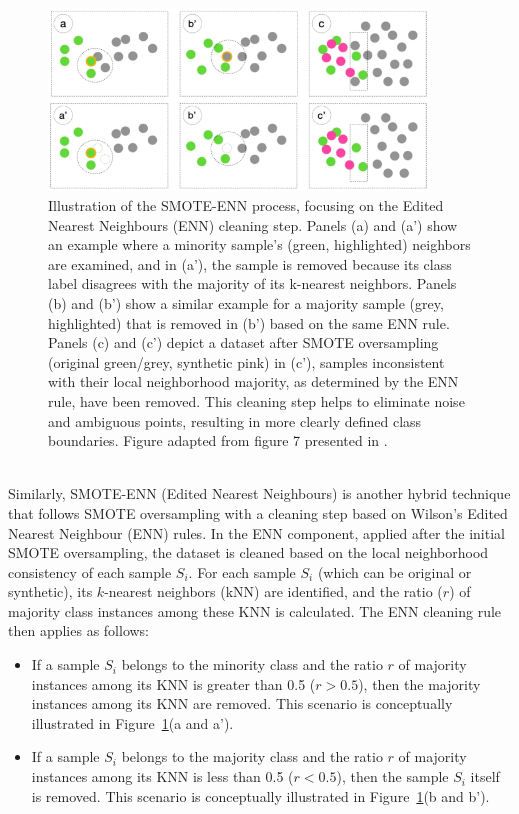 \documentclass[12pt,a4paper]{report}
\begin{document}
\begin{figure}[h!]
  \centering
  \includegraphics[width=0.9\textwidth]{images/SMOTE-EEN.png}
  \caption[Illustration of SMOTE-ENN Process]{Illustration of the SMOTE-ENN process, focusing on the Edited Nearest Neighbours (ENN) cleaning step. Panels (a) and (a') show an example where a minority sample's (green, highlighted) neighbors are examined, and in (a'), the sample is removed because its class label disagrees with the majority of its k-nearest neighbors. Panels (b) and (b') show a similar example for a majority sample (grey, highlighted) that is removed in (b') based on the same ENN rule. Panels (c) and (c') depict a dataset after SMOTE oversampling (original green/grey, synthetic pink) in (c'), samples inconsistent with their local neighborhood majority, as determined by the ENN rule, have been removed. This cleaning step helps to eliminate noise and ambiguous points, resulting in more clearly defined class boundaries. Figure adapted from figure 7 presented in \cite{Truong2022SMOTEVariants}.}
  \label{fig:SMOTE-ENN} %
\end{figure}
\\
\noindent
Similarly, SMOTE-ENN (Edited Nearest Neighbours) \cite{Batista2004Study} is another hybrid technique that follows SMOTE oversampling with a cleaning step based on Wilson’s Edited Nearest Neighbour (ENN) rules. In the ENN component, applied after the initial SMOTE oversampling, the dataset is cleaned based on the local neighborhood consistency of each sample $S_i$. For each sample $S_i$ (which can be original or synthetic), its $k$-nearest neighbors (kNN) are identified, and the ratio ($r$) of majority class instances among these KNN is calculated. The ENN cleaning rule then applies as follows:
\begin{itemize}
    \item If a sample $S_i$ belongs to the minority class and the ratio $r$ of majority instances among its KNN is greater than 0.5 ($r > 0.5$), then the majority instances among its KNN are removed. This scenario is conceptually illustrated in Figure~\ref{fig:SMOTE-ENN}(a and a').
    \item If a sample $S_i$ belongs to the majority class and the ratio $r$ of majority instances among its KNN is less than 0.5 ($r < 0.5$), then the sample $S_i$ itself is removed. This scenario is conceptually illustrated in Figure~\ref{fig:SMOTE-ENN}(b and b').
\end{itemize}
\end{document}
